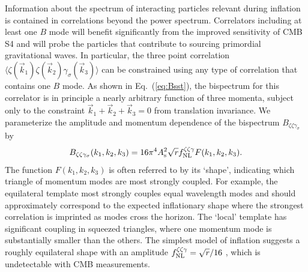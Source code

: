 
Information about the spectrum of interacting particles relevant during inflation is contained in correlations beyond the power spectrum. Correlators including at least one $B$ mode will benefit significantly from the improved sensitivity of CMB S4 and will probe the particles that contribute to sourcing primordial gravitational waves. In particular, the three point correlation $\langle \zeta(\vec{k}_1)\zeta(\vec{k}_2)\gamma_\sigma(\vec{k}_3) \rangle$ can be constrained using any type of correlation that contains one $B$ mode. As shown in Eq.~(\ref{eq:Bsst}), the bispectrum for this correlator is in principle a nearly arbitrary function of three momenta, subject only to the constraint $\vec{k}_1+\vec{k}_2+\vec{k}_3=0$ from translation invariance. We parameterize the amplitude and momentum dependence of the bispectrum $B_{\zeta\zeta\gamma_\sigma}$ by \cite{Meerburg:2016ecv}
\begin{equation}
\label{eq:Bzzg}
B_{\zeta\zeta\gamma_\sigma}(k_1,k_2,k_3)= 16 \pi^4 A_{\rm s}^2 \sqrt{r}f_\mathrm{NL}^{\zeta\zeta\gamma} F(k_1,k_2,k_3).
\end{equation} 
The function $F(k_1,k_2,k_3)$ is often referred to by its `shape', indicating which triangle of momentum modes are most strongly coupled.  For example, the equilateral template most strongly couples equal wavelength modes and should approximately correspond to the expected inflationary shape where the strongest correlation is imprinted as modes cross the horizon. The `local' template has significant coupling in squeezed triangles, where one momentum mode is substantially smaller than the others. The simplest model of inflation suggests a roughly equilateral shape with an amplitude $f^{\zeta \zeta\gamma }_{\rm NL} = \sqrt{r}/16$ \cite{Maldacena:2002vr,Maldacena:2011nz}, which is undetectable with CMB measurements. 

